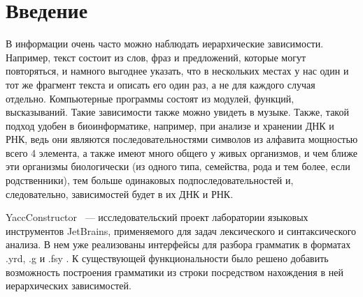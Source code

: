 \documentclass[14pt]{matmex-diploma}
\begin{document}

\maketitle
\tableofcontents
\section*{Введение}
    В информации очень часто можно наблюдать иерархические зависимости. Например, текст состоит из слов, фраз и предложений, которые могут повторяться, и намного выгоднее указать, что в нескольких местах у нас один и тот же фрагмент текста и описать его один раз, а не для каждого случая отдельно. Компьютерные программы состоят из модулей, функций, высказываний. Такие зависимости также можно увидеть в музыке. Также,  такой подход удобен в биоинформатике, например, при анализе и хранении ДНК и РНК, ведь они являются последовательностями символов из алфавита мощностью всего 4 элемента, а также имеют много общего у живых организмов, и чем ближе эти организмы биологически (из одного типа, семейства, рода и тем более, если родственники), тем больше одинаковых подпоследовательностей и, следовательно, зависимостей будет в их ДНК и РНК.
     
     YaccConstructor~\cite{YaccConstructorPage} --- исследовательский проект лаборатории языковых инструментов JetBrains, применяемого для задач лексического и синтаксического анализа. В нем уже реализованы интерфейсы для разбора грамматик в форматах .yrd, .g и .fsy . К существующей функциональности было решено добавить возможность построения грамматики из строки посредством нахождения в ней иерархических зависимостей. 
\end{document}
